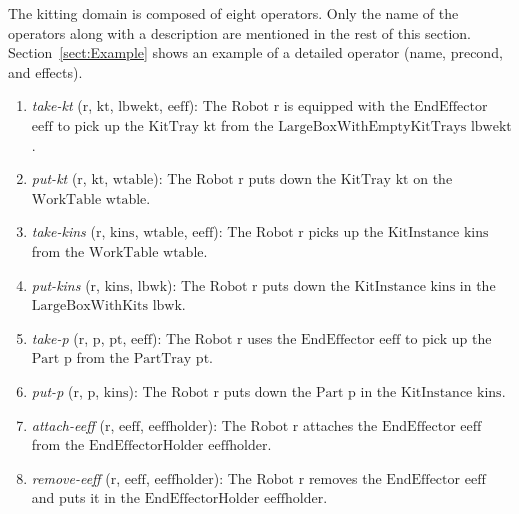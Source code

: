 The kitting domain is composed of eight operators. Only the name of the operators along with a description are mentioned in the rest of this section. Section~\ref{sect:Example} shows an example of a detailed operator (name, precond, and effects).

\begin{enumerate}
\item \textsl{take-kt} ($\mathrm{r}$, $\mathrm{kt}$, $\mathrm{lbwekt}$, $\mathrm{eeff}$): The $\mathrm{Robot}$ $\mathrm{r}$ is equipped with the $\mathrm{EndEffector}$ $\mathrm{eeff}$ to pick up the $\mathrm{KitTray}$ $\mathrm{kt}$ from the $\mathrm{LargeBoxWithEmptyKitTrays}$ $\mathrm{lbwekt}$.

\item \textsl{put-kt} ($\mathrm{r}$, $\mathrm{kt}$, $\mathrm{wtable}$): The $\mathrm{Robot}$ $\mathrm{r}$ puts down the $\mathrm{KitTray}$ $\mathrm{kt}$ on the $\mathrm{WorkTable}$ $\mathrm{wtable}$.

\item \textsl{take-kins} ($\mathrm{r}$, $\mathrm{kins}$, $\mathrm{wtable}$, $\mathrm{eeff}$): The $\mathrm{Robot}$ $\mathrm{r}$ picks up the $\mathrm{KitInstance}$ $\mathrm{kins}$ from the $\mathrm{WorkTable}$ $\mathrm{wtable}$.

\item \textsl{put-kins} ($\mathrm{r}$, $\mathrm{kins}$, $\mathrm{lbwk}$): The $\mathrm{Robot}$ $\mathrm{r}$ puts down the $\mathrm{KitInstance}$ $\mathrm{kins}$ in the $\mathrm{LargeBoxWithKits}$ $\mathrm{lbwk}$.

\item \textsl{take-p} ($\mathrm{r}$, $\mathrm{p}$, $\mathrm{pt}$, $\mathrm{eeff}$): The $\mathrm{Robot}$ $\mathrm{r}$ uses the $\mathrm{EndEffector}$ $\mathrm{eeff}$ to pick up the $\mathrm{Part}$ $\mathrm{p}$ from the $\mathrm{PartTray}$ $\mathrm{pt}$.

\item \textsl{put-p} ($\mathrm{r}$, $\mathrm{p}$, $\mathrm{kins}$): The $\mathrm{Robot}$ $\mathrm{r}$ puts down the $\mathrm{Part}$ $\mathrm{p}$ in the $\mathrm{KitInstance}$ $\mathrm{kins}$.

\item \textsl{attach-eeff} ($\mathrm{r}$, $\mathrm{eeff}$, $\mathrm{eeffholder}$): The $\mathrm{Robot}$ $\mathrm{r}$ attaches the $\mathrm{EndEffector}$ $\mathrm{eeff}$ from the $\mathrm{EndEffectorHolder}$ $\mathrm{eeffholder}$.

\item \textsl{remove-eeff} ($\mathrm{r}$, $\mathrm{eeff}$, $\mathrm{eeffholder}$): The $\mathrm{Robot}$ $\mathrm{r}$ removes the $\mathrm{EndEffector}$ $\mathrm{eeff}$ and puts it in the $\mathrm{EndEffectorHolder}$ $\mathrm{eeffholder}$.
\end{enumerate}


